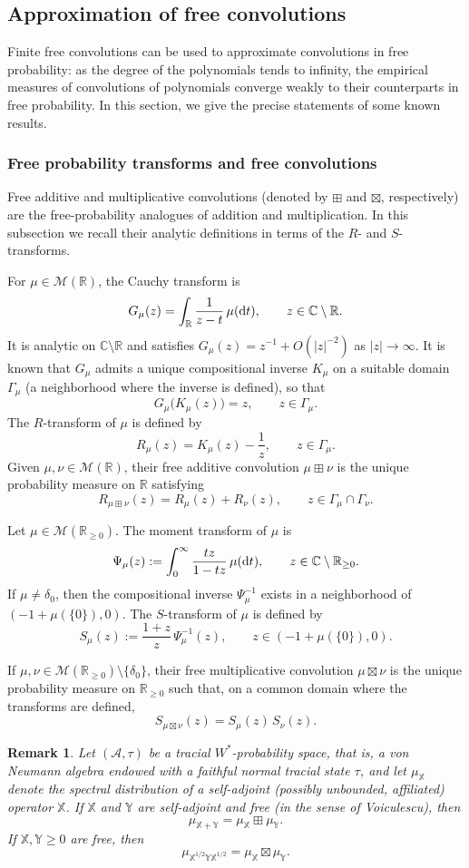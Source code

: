 \documentclass[a4paper,11pt]{amsart}
\numberwithin{equation}{section}
\newtheorem{remark}[theorem]{Remark}
\newcommand{\C}{\mathbb{C}}
\newcommand{\R}{\mathbb{R}}
\newcommand{\dt}{{\rm d} t}
\newcommand{\MM}{\mathcal{M}}
\def \X {{\mathbb X}}
\def \Y {{\mathbb Y}}
\begin{document}
\subsection{Approximation of free convolutions} 
Finite free convolutions can be used to approximate convolutions in free probability: as the degree of the polynomials tends to infinity, the empirical measures of convolutions of polynomials converge weakly to their counterparts in free probability. In this section, we give the precise statements of some known results.

\subsubsection{Free probability transforms and free convolutions}\label{sec:tr}

Free additive and multiplicative convolutions (denoted by $\boxplus$ and $\boxtimes$, respectively) are the free-probability analogues of addition and multiplication. In this subsection we recall their analytic definitions in terms of the $R$- and $S$-transforms.

For $\mu\in\MM(\R)$, the Cauchy transform is
\[
  G_\mu(z)=\int_{\R}\frac{1}{z-t}\,\mu(\dt),\qquad z\in\C\setminus\R.
\]
It is analytic on $\C\setminus\R$ and satisfies $G_\mu(z)=z^{-1}+O(|z|^{-2})$ as $|z|\to\infty$.
It is known that $G_\mu$ admits a unique compositional inverse $K_\mu$ on a suitable domain
$\Gamma_\mu$ (a neighborhood where the inverse is defined), so that
\[
  G_\mu\bigl(K_\mu(z)\bigr)=z,\qquad z\in\Gamma_\mu.
\]
The $R$-transform of $\mu$ is defined by
\[
  R_\mu(z)=K_\mu(z)-\frac1z,\qquad z\in\Gamma_\mu.
\]
Given $\mu,\nu\in\MM(\R)$, their free additive convolution $\mu\boxplus\nu$ is the unique probability
measure on $\R$ satisfying
\[
  R_{\mu\boxplus\nu}(z)=R_\mu(z)+R_\nu(z),\qquad z\in\Gamma_\mu\cap\Gamma_\nu.
\]

Let $\mu\in\MM(\R_{\ge 0})$. The moment transform of $\mu$ is
\[
  \Psi_\mu(z):=\int_{0}^{\infty}\frac{t z}{1-t z}\,\mu(\dt),\qquad z\in\C\setminus\R_{\ge 0}.
\]
If $\mu\neq\delta_0$, then the compositional inverse $\Psi_\mu^{-1}$ exists in a neighborhood of
$(-1+\mu(\{0\}),0)$. The $S$-transform of $\mu$ is defined by
\[
  S_\mu(z):=\frac{1+z}{z}\,\Psi_\mu^{-1}(z),\qquad z\in(-1+\mu(\{0\}),0).
\]

If $\mu,\nu\in\MM(\R_{\ge 0})\setminus\{\delta_0\}$, their free multiplicative convolution $\mu\boxtimes\nu$
is the unique probability measure on $\R_{\ge 0}$ such that, on a common domain where the transforms
are defined,
\[
  S_{\mu\boxtimes\nu}(z)=S_\mu(z)\,S_\nu(z).
\]
\begin{remark}\label{rem:free}
Let $(\mathcal A,\tau)$ be a tracial $W^*$-probability space, that is, a von Neumann algebra
endowed with a faithful normal tracial state $\tau$, and let $\mu_\X$ denote the spectral distribution of a self-adjoint (possibly unbounded, affiliated) operator $\X$. If $\X$ and $\Y$
are self-adjoint and free (in the sense of Voiculescu), then
\[
  \mu_{\X+\Y}=\mu_\X\boxplus\mu_\Y.
\]
If $\X,\Y\ge 0$ are free, then
\[
  \mu_{\X^{1/2} \Y \X^{1/2}}=\mu_\X\boxtimes\mu_\Y.
\]
\end{remark}
\end{document}
